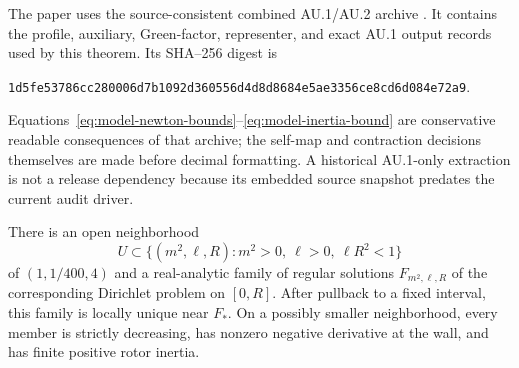 The paper uses the source-consistent combined AU.1/AU.2 archive
.  It contains
the profile, auxiliary, Green-factor, representer, and exact AU.1 output records
used by this theorem.  Its SHA--256 digest is
\begin{center}
\small\nolinkurl{1d5fe53786cc280006d7b1092d360556d4d8d8684e5ae3356ce8cd6d084e72a9}.
\end{center}
Equations~\eqref{eq:model-newton-bounds}--\eqref{eq:model-inertia-bound} are
conservative readable consequences of that archive; the self-map and
contraction decisions themselves are made before decimal formatting.  A
historical AU.1-only extraction is not a release dependency because its
embedded source snapshot predates the current audit driver.

\begin{corollary}
\label{cor:local-parameter-branch}
There is an open neighborhood
\[
 U\subset\{(m^2,\ell,R):m^2>0,\ \ell>0,\ \ell R^2<1\}
\]
of $(1,1/400,4)$ and a real-analytic family of regular solutions
$F_{m^2,\ell,R}$ of the corresponding Dirichlet problem on $[0,R]$.
After pullback to a fixed interval, this family is locally unique near
$F_*$.  On a possibly smaller neighborhood, every member is strictly
decreasing, has nonzero negative derivative at the wall, and has finite
positive rotor inertia.
\end{corollary}

